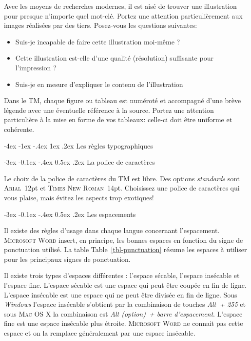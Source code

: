 \documentclass[
  a4paper,
]{book}
\makeatletter
\providecommand{\tightlist}{%
  \setlength{\itemsep}{0pt}\setlength{\parskip}{0pt}}\usepackage{longtable,booktabs,array}
\providecommand{\tightlist}{%
  \setlength{\itemsep}{0pt}\setlength{\parskip}{0pt}}
\renewcommand{\section}{\@startsection{section}{1}{\z@}
{-4ex \@plus -1ex \@minus -.4ex}
{1ex \@plus.2ex }
{\normalfont\large\sffamily\bfseries}}
\renewcommand{\subsection}{\@startsection {subsection}{2}{\z@}
{-3ex \@plus -0.1ex \@minus -.4ex}
{0.5ex \@plus.2ex }
{\normalfont\sffamily\bfseries}}
\newlength\esp
\makeatother
\begin{document}
Avec les moyens de recherches modernes, il est aisé de trouver une
illustration pour presque n'importe quel mot-clé. Portez une attention
particulièrement aux images réalisées par des tiers. Posez-vous les
questions suivantes:

\begin{itemize}
\tightlist
\item
  Suis-je incapable de faire cette illustration moi-même ?
\item
  Cette illustration est-elle d'une qualité (résolution) suffisante pour
  l'impression ?
\item
  Suis-je en mesure d'expliquer le contenu de l'illustration
\end{itemize}

Dans le TM, chaque figure ou tableau est numéroté et accompagné d'une
brève légende avec une éventuelle référence à la source. Portez une
attention particulière à la mise en forme de vos tableaux: celle-ci doit
être uniforme et cohérente.

\hypertarget{les-ruxe8gles-typographiques}{%
\section{Les règles typographiques}\label{les-ruxe8gles-typographiques}}

\hypertarget{la-police-de-caractuxe8res}{%
\subsection{La police de caractères}\label{la-police-de-caractuxe8res}}

Le choix de la police de caractères du TM est libre. Des options
\emph{standards} sont \textsc{Arial}~12pt et \textsc{Times New
Roman}~14pt. Choisissez une police de caractères qui vous plaise, mais
évitez les aspects trop exotiques!

\hypertarget{les-espacements}{%
\subsection{Les espacements}\label{les-espacements}}

Il existe des règles d'usage dans chaque langue concernant l'espacement.
\textsc{Microsoft Word} insert, en principe, les bonnes espaces en
fonction du signe de ponctuation utilisé. La table
Table~\ref{tbl-punctuation} résume les espaces à utiliser pour les
principaux signes de ponctuation.

Il existe trois types d'espaces différentes : l'espace sécable, l'espace
insécable et l'espace fine. L'espace sécable est une espace qui peut
être coupée en fin de ligne. L'espace insécable est une espace qui ne
peut être divisée en fin de ligne. Sous \emph{Windows} l'espace
insécable s'obtient par la combinaison de touches \emph{Alt~+ 255} et
sous \textsc{Mac OS X} la combinaison est \emph{Alt (option)~+ barre
d'espacement}. L'espace fine est une espace insécable plus étroite.
\textsc{Microsoft Word} ne connait pas cette espace et on la remplace
généralement par une espace insécable.
\end{document}

